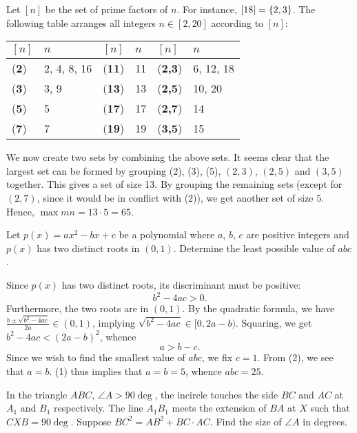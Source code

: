 Let $[n]$ be the set of prime factors of $n$. For instance, $[18] = \left\lbrace 2, 3 \right\rbrace$. The following table arranges all integers $n \in [2, 20]$ according to $[n]$:
\begin{table}[h]
    \centering
    \begin{tabular}{|l|l|l|l|l|l|}
    \hline
    $[n]$ & $n$ & $[n]$ & $n$ & $[n]$ & $n$ \\ \hline
    (\textbf{2}) & 2, 4, 8, 16 & (\textbf{11}) & 11 & (\textbf{2,3}) & 6, 12, 18 \\ \hline
    (\textbf{3}) & 3, 9 & (\textbf{13}) & 13 & (\textbf{2,5}) & 10, 20 \\ \hline
    (\textbf{5}) & 5 & (\textbf{17}) & 17 & (\textbf{2,7}) & 14 \\ \hline
    (\textbf{7}) & 7 & (\textbf{19}) & 19 & (\textbf{3,5}) & 15 \\ \hline
    \end{tabular}
\end{table}

We now create two sets by combining the above sets. It seems clear that the largest set can be formed by grouping (2), (3), (5), $(2, 3)$, $(2, 5)$ and $(3, 5)$ together. This gives a set of size 13. By grouping the remaining sets (except for $(2, 7)$, since it would be in conflict with (2)), we get another set of size $5$. Hence, $\max mn = 13 \cdot 5 = 65$.


\begin{question}[25]\label{A::2021-O-1-20}
    Let $p(x) = ax^2 - bx + c$ be a polynomial where $a$, $b$, $c$ are positive integers and $p(x)$ has two distinct roots in $(0, 1)$. Determine the least possible value of $abc$.
\end{question}

Since $p(x)$ has two distinct roots, its discriminant must be positive: \[b^2 - 4ac > 0. \tag{1}\] Furthermore, the two roots are in $(0, 1)$. By the quadratic formula, we have $\frac{b \pm \sqrt{b^2 - 4ac}}{2a} \in (0, 1)$, implying $\sqrt{b^2 - 4ac} \in [0, 2a-b)$. Squaring, we get $b^2 - 4ac < (2a-b)^2$, whence \[a > b - c.\tag{2}\] Since we wish to find the smallest value of $abc$, we fix $c = 1$. From (2), we see that $a = b$. (1) thus implies that $a = b = 5$, whence $abc = 25$.

\begin{question}[108]\label{A::2021-O-1-21}
    In the triangle $ABC$, $\angle A > 90\deg$, the incircle touches the side $BC$ and $AC$ at $A_1$ and $B_1$ respectively. The line $A_1 B_1$ meets the extension of $BA$ at $X$ such that $CXB = 90\deg$. Suppose $BC^2 = AB^2 + BC \cdot AC$. Find the size of $\angle A$ in degrees.
\end{question}

